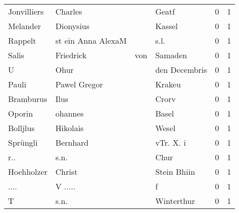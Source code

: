 \begin{center}
\begin{tiny}
\begin{longtabu}{llllrr}
              Jonvilliers &                            Charles &             &                                       Geatf &          0 &         1 \\
                 Melander &                          Dionysius &             &                                      Kassel &          0 &         1 \\
                  Rappelt &                 st ein Anna AlexaM &             &                                        s.l. &          0 &         1 \\
                    Salis &                          Friedrick &         von &                                     Samaden &          0 &         1 \\
                        U &                               Ohur &             &                               den Decembris &          0 &         1 \\
                    Pauli &                       Pawel Gregor &             &                                      Krakeu &          0 &         1 \\
                Bramburus &                               Ilus &             &                                       Crorv &          0 &         1 \\
                   Oporin &                            ohannes &             &                                       Basel &          0 &         1 \\
                 Bolljlus &                           Hikolais &             &                                       Wesel &          0 &         1 \\
                 Sprüngli &                           Bernhard &             &                                   vTr. X. i &          0 &         1 \\
                      r.. &                               s.n. &             &                                        Chur &          0 &         1 \\
               Hoehholzer &                             Christ &             &                                 Stein Bhiin &          0 &         1 \\
                     .... &                            V ..... &             &                                           f &          0 &         1 \\
                        T &                               s.n. &             &                                  Winterthur &          0 &         1 \\

\end{longtabu}
\end{tiny}
\end{center}
